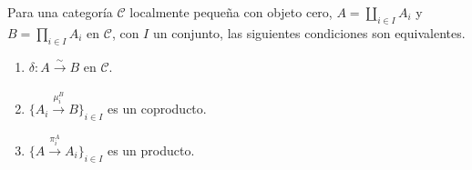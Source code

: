 \documentclass[tesis]{subfiles}
\begin{document}
\begin{Prop} \label{Mendoza-1.8.12}
    Para una categoría $\mathscr{C}$ localmente pequeña con objeto cero, $A=\coprod_{i\in I}A_i$ y $B = \prod_{i\in I}A_i$ en $\mathscr{C}$, con $I$ un conjunto, las siguientes condiciones son equivalentes.

    \begin{enumerate}[label=(\alph*)]
        \item $\delta:A\xrightarrow[]{\sim} B$ en $\mathscr{C}$.

        \item $\big\{A_i\xrightarrow[]{\mu^B_i} B\big\}_{i\in I}$ es un coproducto.

        \item $\big\{A\xrightarrow[]{\pi^A_i} A_i\big\}_{i\in I}$ es un producto.
    \end{enumerate}
\end{Prop}
\end{document}
